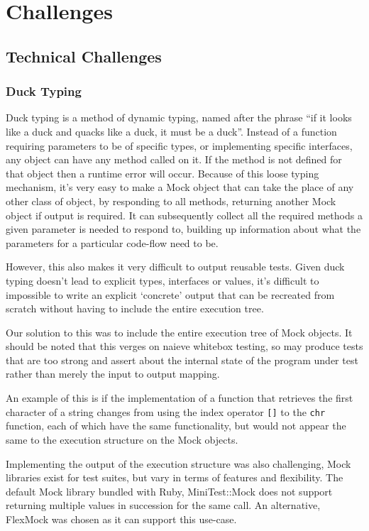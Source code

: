\chapter{Challenges}
\section{Technical Challenges}
  \subsection{Duck Typing}
    Duck typing is a method of dynamic typing, named after the phrase ``if it looks like a duck and quacks like a duck, it must be a duck''.
    Instead of a function requiring parameters to be of specific types, or implementing specific interfaces, any object can have any method called on it.
    If the method is not defined for that object then a runtime error will occur.
    Because of this loose typing mechanism, it's very easy to make a Mock object that can take the place of any other class of object, by responding to all methods, returning another Mock object if output is required.
    It can subsequently collect all the required methods a given parameter is
needed to respond to, building up information about what the parameters for a particular code-flow need to be.

    However, this also makes it very difficult to output reusable tests.
    Given duck typing doesn't lead to explicit types, interfaces or values, it's difficult to impossible to write an explicit `concrete' output that can be recreated from scratch without having to include the entire execution tree.

    Our solution to this was to include the entire execution tree of Mock
objects. It should be noted that this verges on naieve whitebox testing, so may
produce tests that are too strong and assert about the internal state of the
program under test rather than merely the input to output mapping.

An example of this is if the implementation of a function that retrieves the
first character of a string changes from using the index operator \texttt{[]} to
the \texttt{chr}
function, each of which have the same functionality, but would not appear the same
to the execution structure on the Mock objects.

    Implementing the output of the execution structure was also challenging,
Mock libraries exist for test suites, but vary in terms of features and
flexibility. The default Mock library bundled with Ruby, MiniTest::Mock does not
support returning multiple values in succession for the same call. An
alternative, FlexMock was chosen as it can support this use-case.

